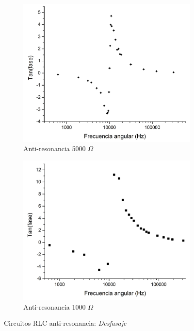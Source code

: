 \documentclass[11pt,a4paper]{article}
\begin{document}
\begin{figure}[h]

\begin{subfigure}{0.5\textwidth}
\includegraphics[scale=0.32]{RLC_ARES_5000_Tan(fase)vsF}
  \caption{Anti-resonancia 5000 $\Omega$}
  \label{subfig:ARES_D.a}
\end{subfigure}
\begin{subfigure}{0.5\textwidth}
\includegraphics[scale=0.32]{RLC_ARES_1000_Tan(fase)vsF}
  \caption{Anti-resonancia 1000 $\Omega$}
  \label{subfig:ARES_D.b}
\end{subfigure}
  \caption{Circuitos RLC anti-resonancia: \textit{Desfasaje}}
  \label{fig:ARES_D}
\end{figure}
\end{document}
